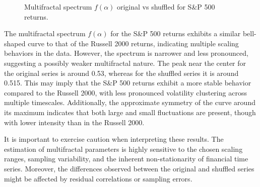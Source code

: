 \documentclass[11pt]{extarticle}
\begin{document}
\begin{figure}[htbp]
    \centering
    \caption{Multifractal spectrum $f(\alpha)$ original vs shuffled for S\&P 500 returns.}
\end{figure}

\FloatBarrier

The multifractal spectrum $f(\alpha)$ for the S\&P 500 returns exhibits a similar bell-shaped curve to that of the Russell
2000 returns, indicating multiple scaling behaviors in the data. However, the spectrum is narrower and less pronounced,
suggesting a possibly weaker multifractal nature. The peak near the center for the original series is around 0.53,
whereas for the shuffled series it is around 0.515. This may imply that the S\&P 500 returns exhibit a more stable
behavior compared to the Russell 2000, with less pronounced volatility clustering across multiple timescales.
Additionally, the approximate symmetry of the curve around its maximum indicates that both large and small fluctuations
are present, though with lower intensity than in the Russell 2000.

It is important to exercise caution when interpreting these results. The estimation of multifractal parameters is highly
sensitive to the chosen scaling ranges, sampling variability, and the inherent non-stationarity of financial time series.
Moreover, the differences observed between the original and shuffled series might be affected by residual correlations
or sampling errors.
\end{document}
